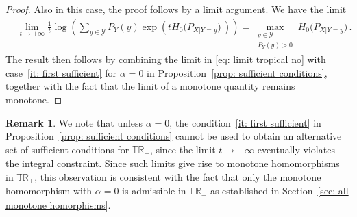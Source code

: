 \documentclass[aps,pra,11pt,onecolumn,nofootinbib,tightenlines]{revtex4-2}
\theoremstyle{definition}
\newtheorem{remark}[theorem]{Remark}
\begin{document}
\begin{proof}
Also in this case, the proof follows by a limit argument. We have the limit
    \begin{align}
    \label{eq: limit tropical no}
&\lim_{t \to +\infty} \frac{1}{t} 
\log\left( \sum_{y \in \mathcal{Y}} P_Y(y) 
\exp\left( t  H_0\big(P_{X|Y = y}\big) \, \right) \right) = \max \limits_{\substack{y \in \mathcal{Y} \\ P_Y( y) > 0}}  H_0\big(P_{X|Y = y}\big)  \,.
\end{align}
The result then follows by combining the limit in \eqref{eq: limit tropical no} with case~\eqref{it: first sufficient} for $\alpha = 0$ in Proposition~\ref{prop: sufficient conditions}, together with the fact that the limit of a monotone quantity remains monotone.
\end{proof}

\begin{remark}
    We note that unless $\alpha=0$, the condition~\eqref{it: first sufficient} in Proposition~\ref{prop: sufficient conditions} 
cannot be used to obtain an alternative set of sufficient conditions for $\mathbb{T}\mathbb{R}_+$, since the limit $t\to+\infty$ eventually violates the integral constraint. Since such limits give rise to monotone homomorphisms in $\mathbb{T}\mathbb{R}_+$, this observation is consistent with the fact that only the monotone homomorphism with $\alpha = 0$ is admissible in $\mathbb{T}\mathbb{R}_+$ as established in Section~\ref{sec: all monotone homorphisms}.
\end{remark}
\end{document}
